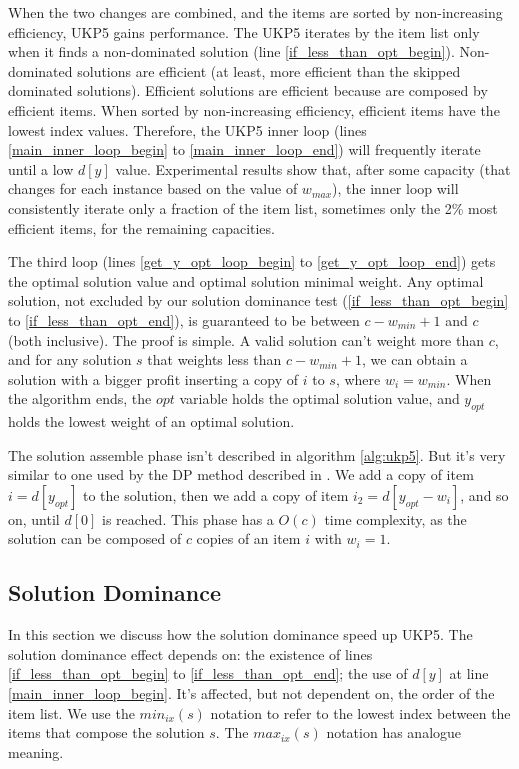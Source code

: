 \documentclass[runningheads,a4paper]{llncs}
\begin{document}
When the two changes are combined, and the items are sorted by non-increasing efficiency, UKP5 gains performance. The UKP5 iterates by the item list only when it finds a non-dominated solution (line \ref{if_less_than_opt_begin}). Non-dominated solutions are efficient (at least, more efficient than the skipped dominated solutions). Efficient solutions are efficient because are composed by efficient items. When sorted by non-increasing efficiency, efficient items have the lowest index values. Therefore, the UKP5 inner loop (lines \ref{main_inner_loop_begin} to \ref{main_inner_loop_end}) will frequently iterate until a low \(d[y]\) value. Experimental results show that, after some capacity (that changes for each instance based on the value of \(w_{max}\)), the inner loop will consistently iterate only a fraction of the item list, sometimes only the 2\% most efficient items, for the remaining capacities.

The third loop (lines \ref{get_y_opt_loop_begin} to \ref{get_y_opt_loop_end}) gets the optimal solution value and optimal solution minimal weight. Any optimal solution, not excluded by our solution dominance test (\ref{if_less_than_opt_begin} to \ref{if_less_than_opt_end}), is guaranteed to be between \(c - w_{min} + 1\) and \(c\) (both inclusive). The proof is simple. A valid solution can't weight more than \(c\), and for any solution \(s\) that weights less than \(c - w_{min} + 1\), we can obtain a solution with a bigger profit inserting a copy of \(i\) to \(s\), where \(w_i = w_{min}\). When the algorithm ends, the \(opt\) variable holds the optimal solution value, and \(y_{opt}\) holds the lowest weight of an optimal solution. 

The solution assemble phase isn't described in algorithm \ref{alg:ukp5}. But it's very similar to one used by the DP method described in \cite[p. 221, Steps 6-8]{gar72}. We add a copy of item \(i = d[y_{opt}]\) to the solution, then we add a copy of item \(i_2 = d[y_{opt} - w_i]\), and so on, until \(d[0]\) is reached. This phase has a \(O(c)\) time complexity, as the solution can be composed of \(c\) copies of an item \(i\) with \(w_i = 1\).


\subsection{Solution Dominance}

In this section we discuss how the solution dominance speed up UKP5. The solution dominance effect depends on: the existence of lines \ref{if_less_than_opt_begin} to \ref{if_less_than_opt_end}; the use of \(d[y]\) at line \ref{main_inner_loop_begin}. It's affected, but not dependent on, the order of the item list. We use the \(min_{ix}(s)\) notation to refer to the lowest index between the items that compose the solution \(s\). The \(max_{ix}(s)\) notation has analogue meaning.
\end{document}
